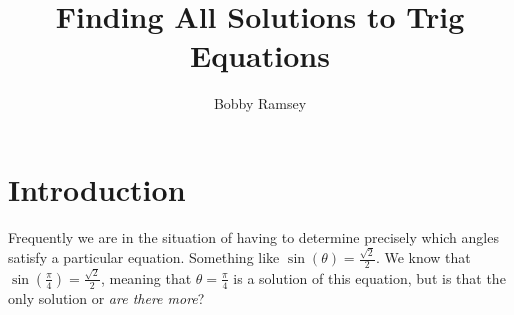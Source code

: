 \documentclass[nooutcomes]{ximera}
\author{Bobby Ramsey}
\title{Finding All Solutions to Trig Equations}
\begin{document}
\begin{abstract}
	
\end{abstract}
\maketitle




\section{Introduction}

Frequently we are in the situation of having to determine precisely which angles satisfy a particular equation. Something like $\sin(\theta) = \frac{\sqrt{2}}{2}$. We know that $\sin\left( \frac{\pi}{4} \right) = \frac{\sqrt{2}}{2}$, meaning that $\theta = \frac{\pi}{4}$ is a solution of this equation, but is that the only solution or \emph{are there more}?
\end{document}
